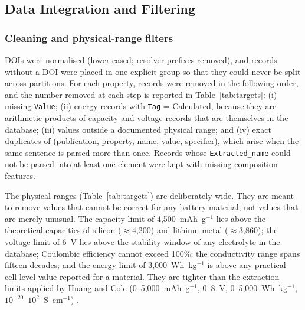 \documentclass[journal=jcisd8,manuscript=article,layout=traditional]{achemso}
\begin{document}
\subsection{Data Integration and Filtering}
\label{sec:integration}

\subsubsection{Cleaning and physical-range filters}
\label{sec:cleaning}

DOIs were normalised (lower-cased; resolver prefixes removed), and records without a DOI were placed in one explicit group so that they could never be split across partitions. For each property, records were removed in the following order, and the number removed at each step is reported in Table~\ref{tab:targets}: (i) missing \texttt{Value}; (ii) energy records with \texttt{Tag} = Calculated, because they are arithmetic products of capacity and voltage records that are themselves in the database; (iii) values outside a documented physical range; and (iv) exact duplicates of (publication, property, name, value, specifier), which arise when the same sentence is parsed more than once. Records whose \texttt{Extracted\_name} could not be parsed into at least one element were kept with missing composition features.

The physical ranges (Table~\ref{tab:targets}) are deliberately wide. They are meant to remove values that cannot be correct for any battery material, not values that are merely unusual. The capacity limit of 4,500~mAh~g$^{-1}$ lies above the theoretical capacities of silicon ($\approx$4,200) and lithium metal ($\approx$3,860); the voltage limit of 6~V lies above the stability window of any electrolyte in the database; Coulombic efficiency cannot exceed 100\%; the conductivity range spans fifteen decades; and the energy limit of 3,000~Wh~kg$^{-1}$ is above any practical cell-level value reported for a material. They are tighter than the extraction limits applied by Huang and Cole (0--5,000~mAh~g$^{-1}$, 0--8~V, 0--5,000~Wh~kg$^{-1}$, $10^{-20}$--$10^{2}$~S~cm$^{-1}$) \cite{huang2020database}.
\end{document}
